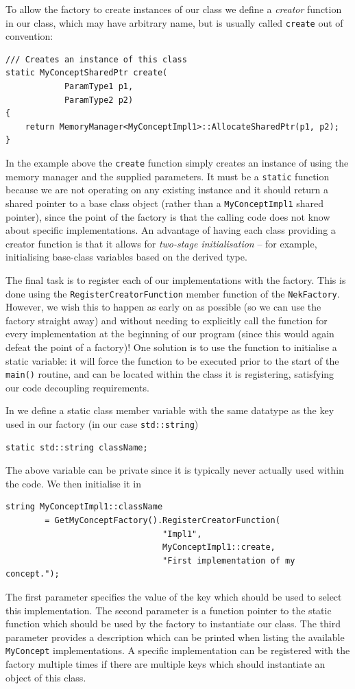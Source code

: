 To allow the factory to create instances of our class we define a \emph{creator} function in our class, which may have arbitrary name, but is usually called \lstinline{create} out of convention:
\begin{lstlisting}
/// Creates an instance of this class
static MyConceptSharedPtr create(
            ParamType1 p1,
            ParamType2 p2)
{
    return MemoryManager<MyConceptImpl1>::AllocateSharedPtr(p1, p2);
}
\end{lstlisting}
In the example above the \lstinline{create} function simply creates an instance of  using the {\nek} memory manager and the
supplied parameters. It must be a \lstinline{static} function because we are not operating on any existing instance and it should return a shared pointer to a base class object (rather than a \lstinline{MyConceptImpl1} shared pointer), since the point of the factory is that the calling code does not know about specific implementations. An advantage of having each class providing a creator function is that it allows for \emph{two-stage initialisation} -- for example, initialising base-class variables based on the derived type.

The final task is to register each of our implementations with the factory. This is done 
using the \lstinline{RegisterCreatorFunction} member function of the \lstinline{NekFactory}.
However, we wish this to happen as early on as possible (so we can use the 
factory straight away) and without needing to explicitly call the function for 
every implementation at the beginning of our program (since this would again 
defeat the point of a factory)! One solution is to use the function to 
initialise a static variable: it will force the function to be executed prior to the start of the \lstinline{main()} routine, and can be located within the class it is registering, satisfying our code decoupling requirements.

In  we define a static class member variable with the same datatype as the key used in our factory (in our case \lstinline{std::string}) 
\begin{lstlisting}
static std::string className;
\end{lstlisting}
The above variable can be private since it is typically never actually
used within the code. We then initialise it in 
\begin{lstlisting}
string MyConceptImpl1::className
        = GetMyConceptFactory().RegisterCreatorFunction(
                                "Impl1", 
                                MyConceptImpl1::create, 
                                "First implementation of my concept.");
\end{lstlisting}
The first parameter specifies the value of the key which should be used to
select this implementation. The second parameter is a function pointer to the
static function which should be used by the factory to instantiate our class. The third parameter provides a description which can be printed when listing the available \lstinline{MyConcept} implementations. A specific implementation can be registered with the factory multiple times if there are multiple keys which should instantiate an object of this class.


